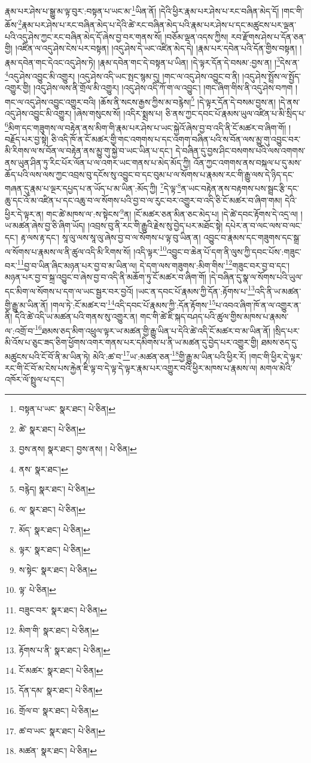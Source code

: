 རྣམ་པར་ཤེས་པ་སྒྱུ་མ་ལྟ་བུར་:བསྟན་པ་ཡང་མ་\footnote{བསྟན་པ་ཡང་  སྣར་ཐང་།  པེ་ཅིན། }ཡིན་ནོ། །དེའི་ཕྱིར་རྣམ་པར་ཤེས་པ་རང་བཞིན་མེད་དོ། །གང་གི་ཆོས་\footnote{ཚེ་  སྣར་ཐང་།  པེ་ཅིན། }རྣམ་པར་ཤེས་པ་རང་བཞིན་མེད་པ་དེའི་ཚེ་རང་བཞིན་མེད་པའི་རྣམ་པར་ཤེས་པ་དང་མཚུངས་པར་ལྡན་པའི་འདུ་ཤེས་ཀྱང་རང་བཞིན་མེད་དོ་ཞེས་བྱ་བར་གནས་སོ། །བཅོམ་ལྡན་འདས་ཀྱིས། རབ་རྫོགས་ཤེས་པ་དོན་ཅན་གྱི། །འཛིན་ལ་འདུ་ཤེས་ངེས་པར་བསྟན། །འདུ་ཤེས་དེ་ཡང་འཛིན་མེད་དེ། །རྣམ་པར་དབེན་པའི་དོན་གྱིས་བསྟན། །
རྣམ་དབེན་གང་དེའང་འདུ་ཤེས་ཏེ། །རྣམ་དབེན་གང་དེ་བསྟན་པ་ཡིན། །དེ་ལྟར་དོན་དེ་བསམ་:བྱས་ན། །\footnote{བྱས་ནས།   སྣར་ཐང་། བྱས་ནས། །  པེ་ཅིན། }དེས་ན་\footnote{ནས་  སྣར་ཐང་། }འདུ་ཤེས་འབྱུང་མི་འགྱུར། །འདུ་ཤེས་འདི་ཡང་སྤང་སྙམ་དུ། །གང་ལ་འདུ་ཤེས་འབྱུང་བ་ནི། །འདུ་ཤེས་སྤྲོས་ལ་སྤྱོད་འགྱུར་གྱི། །འདུ་ཤེས་ལས་ནི་གྲོལ་མི་འགྱུར། །འདུ་ཤེས་འདི་ཀོ་ག་ལ་འབྱུང་། །གང་ཞིག་གིས་ནི་འདུ་ཤེས་བཀག །གང་ལ་འདུ་ཤེས་འབྱུང་འགྱུར་བའི། །ཆོས་ནི་སངས་རྒྱས་ཀྱིས་མ་བརྙེས།\footnote{བརྙེད།  སྣར་ཐང་།  པེ་ཅིན། } །དེ་ལྟར་དོན་དེ་བསམ་བྱས་ན། །དེ་ནས་འདུ་ཤེས་འབྱུང་མི་འགྱུར། །ཞེས་གསུངས་སོ། །འདིར་སྨྲས་པ། ཅི་ནས་ཀྱང་དབང་པོ་རྣམས་ཡུལ་འཛིན་པ་མི་སྲིད་པ་\footnote{ལ་  སྣར་ཐང་།  པེ་ཅིན། }མིག་དང་གཟུགས་ལ་བརྟེན་ནས་མིག་གི་རྣམ་པར་ཤེས་པ་ཡང་སྐྱེའོ་ཞེས་བྱ་བ་འདི་ནི་ངོ་མཚར་བ་ཞིག་གོ། །བརྗོད་པར་བྱ་སྟེ། ཅི་འདི་ཁོ་ན་ངོ་མཚར་གྱི་གང་འགགས་པ་དང་འགག་བཞིན་པའི་ས་བོན་ལས་མྱུ་གུ་འབྱུང་བར་མི་རིགས་ལ་ས་བོན་ལ་བརྟེན་ནས་མྱུ་གུ་སྐྱེ་བ་ཡང་ཡིན་པ་དང་། དེ་བཞིན་དུ་བྱས་ཤིང་བསགས་པའི་ལས་འགགས་ནས་ཡུན་ཤིན་ཏུ་རིང་པོར་ལོན་པ་ལ་འགར་ཡང་གནས་པ་མེད་མོད་ཀྱི། འོན་ཀྱང་འགགས་ནས་བསྐལ་པ་དུ་མས་ཆོད་པའི་ལས་ལས་ཀྱང་འབྲས་བུ་དངོས་སུ་འབྱུང་བ་དང་བུམ་པ་ལ་སོགས་པ་རྣམས་རང་གི་རྒྱུ་ལས་དེ་ཉིད་དང་གཞན་དུ་རྣམ་པ་ལྔར་དཔྱད་པ་ན་ཡོད་པ་མ་ཡིན་:མོད་ཀྱི། \footnote{མོད་  སྣར་ཐང་།  པེ་ཅིན། }དེ་ལྟ་\footnote{ལྟར་  སྣར་ཐང་།  པེ་ཅིན། }ན་ཡང་བརྟེན་ནས་བརྟགས་པས་སྦྲང་རྩི་དང་ཆུ་དང་འོ་མ་འཛིན་པ་དང་འཆུ་བ་ལ་སོགས་པའི་བྱ་བ་ལ་རུང་བར་འགྱུར་བ་འདི་ཅི་ངོ་མཚར་བ་ཞིག་གམ། དེའི་ཕྱིར་དེ་ལྟར་ན། གང་ཚེ་མཁས་ལ་:ས་སྟེངས་\footnote{ས་སྟེང་  སྣར་ཐང་།  པེ་ཅིན། }ན། །ངོ་མཚར་ཅན་མིན་ཅང་མེད་པ། །དེ་ཚེ་དབང་རྟོགས་དེ་འདྲ་ལ། །ཡ་མཚན་ཞེས་བྱ་ཅི་ཞིག་ཡོད། །འབྲས་བུ་ནི་རང་གི་རྒྱུའི་རྗེས་སུ་བྱེད་པར་མཐོང་སྟེ། དཔེར་ན་བ་ལང་ལས་བ་ལང་དང་། རྟ་ལས་རྟ་དང་། སཱ་ལུ་ལས་སཱ་ལུ་ཞེས་བྱ་བ་ལ་སོགས་པ་ལྟ་བུ་ཡིན་ན། འབྱུང་བ་རྣམས་དང་གཟུགས་དང་སྒྲ་ལ་སོགས་པ་རྣམས་ལ་ནི་ཚུལ་འདི་མི་རིགས་སོ། །འདི་ལྟར་\footnote{ལྟ་  པེ་ཅིན། }འབྱུང་བ་ཆེན་པོ་དག་ནི་ལུས་ཀྱི་དབང་པོས་:གཟུང་བར་\footnote{བཟུང་བར་  སྣར་ཐང་།  པེ་ཅིན། }བྱ་བ་ཡིན་ཞིང་མཉན་པར་བྱ་བ་མ་ཡིན་ལ། དེ་དག་ལས་གཟུགས་:མིག་གིས་\footnote{མིག་གི་  སྣར་ཐང་།  པེ་ཅིན། }གཟུང་བར་བྱ་བ་དང་། མཉན་པར་བྱ་བ་སྐྲ་འབྱུང་བ་ཞེས་བྱ་བ་འདི་ནི་མཆོག་ཏུ་ངོ་མཚར་བ་ཞིག་གོ། །དེ་བཞིན་དུ་སྣ་ལ་སོགས་པའི་ཡུལ་དང་མིག་ལ་སོགས་པ་དག་ལ་ཡང་སྦྱར་བར་བྱའོ། །ཡང་ན་དབང་པོ་རྣམས་ཀྱི་དོན་:རྟོགས་པ་\footnote{རྟོགས་པ་ནི་  སྣར་ཐང་།  པེ་ཅིན། }འདི་ནི་ཡ་མཚན་གྱི་རྒྱུ་མ་ཡིན་ནོ། །གལ་ཏེ་:ངོ་མཚར་བ་\footnote{ངོ་མཚར་  སྣར་ཐང་།  པེ་ཅིན། }འདི་དབང་པོ་རྣམས་ཀྱི་:དོན་རྟོགས་\footnote{དོན་དམ་  སྣར་ཐང་།  པེ་ཅིན། }པ་འབའ་ཞིག་ཁོ་ན་ལ་འགྱུར་ན་ནི། དེའི་ཚེ་འདི་ཡ་མཚན་པའི་གནས་སུ་འགྱུར་ན། གང་གི་ཚེ་ཇི་སྐད་བཤད་པའི་ཚུལ་གྱིས་མཁས་པ་རྣམས་ལ་:འགྲོ་བ་\footnote{གྲོལ་བ་  སྣར་ཐང་།  པེ་ཅིན། }ཐམས་ཅད་མིག་འཕྲུལ་ལྟར་ཡ་མཚན་གྱི་རྒྱུ་ཡིན་པ་དེའི་ཚེ་འདི་ངོ་མཚར་བ་མ་ཡིན་ནོ། །སྲིད་པར་མི་འོས་པ་ཅུང་ཟད་ཅིག་ཕྱོགས་འགར་གནས་པར་དམིགས་པ་ནི་ཡ་མཚན་དུ་བྱེད་པར་འགྱུར་གྱི། ཐམས་ཅད་དུ་མཚུངས་པའི་ངོ་བོ་ནི་མ་ཡིན་ཏེ། མེའི་:ཚ་བ་\footnote{ཚ་བ་ཡང་  སྣར་ཐང་།  པེ་ཅིན། }ཡ་:མཚན་ཅན་\footnote{མཚན་  སྣར་ཐང་།  པེ་ཅིན། }གྱི་རྒྱུ་མ་ཡིན་པའི་ཕྱིར་རོ། །གང་གི་ཕྱིར་དེ་ལྟར་རང་གི་ངོ་བོ་མ་ངེས་པས་རྐྱེན་ཇི་ལྟ་བ་དེ་ལྟ་དེ་ལྟར་རྣམ་པར་འགྱུར་བའི་ཕྱིར་མཁས་པ་རྣམས་ལ། མགལ་མེའི་འཁོར་ལོ་སྤྲུལ་པ་དང་། 